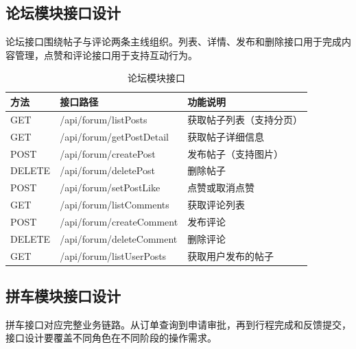 \subsection{论坛模块接口设计}

论坛接口围绕帖子与评论两条主线组织。列表、详情、发布和删除接口用于完成内容管理，点赞和评论接口用于支持互动行为。

\begin{table}[!htbp]
  \caption{论坛模块接口}
  \label{tab:forum-api}
  \centering
  \small
  \begin{tabular}{p{1.6cm}p{4.6cm}p{6.2cm}}
    \toprule
    方法 & 接口路径 & 功能说明 \\
    \midrule
    GET & /api/forum/listPosts & 获取帖子列表（支持分页） \\
    GET & /api/forum/getPostDetail & 获取帖子详细信息 \\
    POST & /api/forum/createPost & 发布帖子（支持图片） \\
    DELETE & /api/forum/deletePost & 删除帖子 \\
    POST & /api/forum/setPostLike & 点赞或取消点赞 \\
    GET & /api/forum/listComments & 获取评论列表 \\
    POST & /api/forum/createComment & 发布评论 \\
    DELETE & /api/forum/deleteComment & 删除评论 \\
    GET & /api/forum/listUserPosts & 获取用户发布的帖子 \\
    \bottomrule
  \end{tabular}
\end{table}

\subsection{拼车模块接口设计}

拼车接口对应完整业务链路。从订单查询到申请审批，再到行程完成和反馈提交，接口设计要覆盖不同角色在不同阶段的操作需求。

